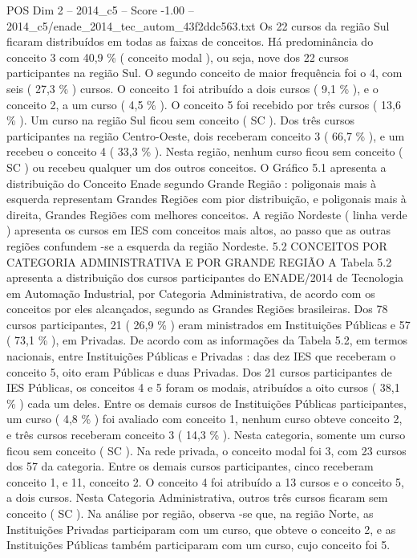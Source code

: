 \begin{textsample}{POS Dim 2 – 2014\_c5 – Score -1.00 – 2014\_c5/enade\_2014\_tec\_autom\_43f2ddc563.txt}
Os 22 cursos da região Sul ficaram distribuídos em todas as faixas de conceitos.
Há predominância do conceito 3 com 40,9 \% ( conceito modal ), ou seja, nove dos 22 cursos participantes na região Sul.
O segundo conceito de maior frequência foi o 4, com seis ( 27,3 \% ) cursos.
O conceito 1 foi atribuído a dois cursos ( 9,1 \% ), e o conceito 2, a um curso ( 4,5 \% ).
O conceito 5 foi recebido por três cursos ( 13,6 \% ).
Um curso na região Sul ficou sem conceito ( SC ).
Dos três cursos participantes na região Centro-Oeste, dois receberam conceito 3 ( 66,7 \% ), e um recebeu o conceito 4 ( 33,3 \% ).
Nesta região, nenhum curso ficou sem conceito ( SC ) ou recebeu qualquer um dos outros conceitos.
O Gráfico 5.1 apresenta a distribuição do Conceito Enade segundo Grande Região : poligonais mais à esquerda representam Grandes Regiões com pior distribuição, e poligonais mais à direita, Grandes Regiões com melhores conceitos.
A região Nordeste ( linha verde ) apresenta os cursos em IES com conceitos mais altos, ao passo que as outras regiões confundem -se a esquerda da região Nordeste. 5.2 CONCEITOS POR CATEGORIA ADMINISTRATIVA E POR GRANDE REGIÃO A Tabela 5.2 apresenta a distribuição dos cursos participantes do ENADE/2014 de Tecnologia em Automação Industrial, por Categoria Administrativa, de acordo com os conceitos por eles alcançados, segundo as Grandes Regiões brasileiras.
Dos 78 cursos participantes, 21 ( 26,9 \% ) eram ministrados em Instituições Públicas e 57 ( 73,1 \% ), em Privadas.
De acordo com as informações da Tabela 5.2, em termos nacionais, entre Instituições Públicas e Privadas : das dez IES que receberam o conceito 5, oito eram Públicas e duas Privadas.
Dos 21 cursos participantes de IES Públicas, os conceitos 4 e 5 foram os modais, atribuídos a oito cursos ( 38,1 \% ) cada um deles.
Entre os demais cursos de Instituições Públicas participantes, um curso ( 4,8 \% ) foi avaliado com conceito 1, nenhum curso obteve conceito 2, e três cursos receberam conceito 3 ( 14,3 \% ).
Nesta categoria, somente um curso ficou sem conceito ( SC ).
Na rede privada, o conceito modal foi 3, com 23 cursos dos 57 da categoria.
Entre os demais cursos participantes, cinco receberam conceito 1, e 11, conceito 2.
O conceito 4 foi atribuído a 13 cursos e o conceito 5, a dois cursos.
Nesta Categoria Administrativa, outros três cursos ficaram sem conceito ( SC ).
Na análise por região, observa -se que, na região Norte, as Instituições Privadas participaram com um curso, que obteve o conceito 2, e as Instituições Públicas também participaram com um curso, cujo conceito foi 5.

\end{textsample}

